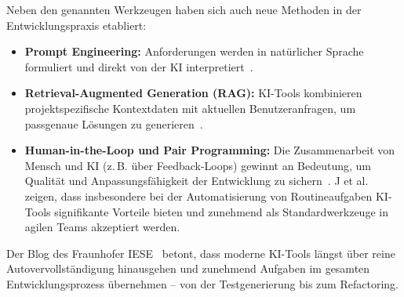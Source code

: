Neben den genannten Werkzeugen haben sich auch neue Methoden in der
Entwicklungspraxis etabliert:
\begin{itemize}
    \item \textbf{Prompt Engineering:} Anforderungen werden in natürlicher Sprache formuliert und direkt von der KI interpretiert~\cite{esposito_generative_2025}.
    \item \textbf{Retrieval-Augmented Generation (RAG):} KI-Tools kombinieren projektspezifische Kontextdaten mit aktuellen Benutzeranfragen, um passgenaue Lösungen zu generieren~\cite{esposito_generative_2025}.
    \item \textbf{Human-in-the-Loop und Pair Programming:} Die Zusammenarbeit von Mensch und KI (z.\,B. über Feedback-Loops) gewinnt an Bedeutung, um Qualität und Anpassungsfähigkeit der Entwicklung zu sichern~\cite{nguyen-duc_generative_2023,siebert_generative_2024}. J et al.~\cite{j_integration_2023} zeigen, dass insbesondere bei der Automatisierung von Routineaufgaben KI-Tools signifikante Vorteile bieten und zunehmend als Standardwerkzeuge in agilen Teams akzeptiert werden.
\end{itemize}

Der Blog des Fraunhofer IESE~\cite{siebert_generative_2024} betont, dass
moderne KI-Tools längst über reine Autovervollständigung hinausgehen und
zunehmend Aufgaben im gesamten Entwicklungsprozess übernehmen – von der
Testgenerierung bis zum Refactoring.